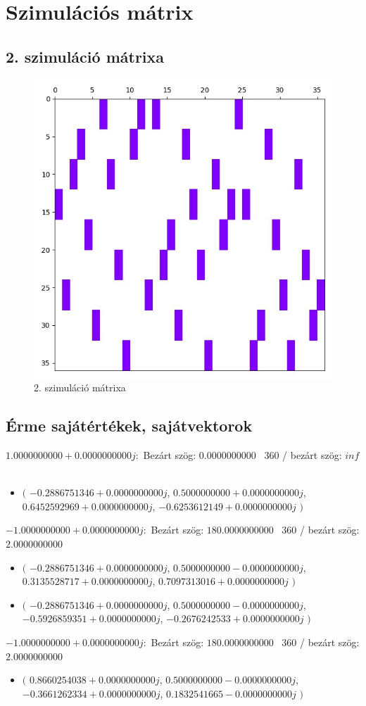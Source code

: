 \documentclass[14pt,a4paper]{article}
\begin{document}
\section{Szimulációs mátrix}
\subsection{2. szimuláció mátrixa}
\begin{figure}[H]
\centering
\includegraphics[width = 0.7\columnwidth]{sim_02/simulation_matrix.jpg}
\caption{2. szimuláció mátrixa}
\end{figure}
\subsection{Érme sajátértékek, sajátvektorok}
$1.0000000000+0.0000000000j$:\
Bezárt szög: $0.0000000000$ \
360 / bezárt szög: $inf$\
\begin{itemize}
\item
$\big($
$-0.2886751346+0.0000000000j$, $0.5000000000+0.0000000000j$, $0.6452592969+0.0000000000j$, $-0.6253612149+0.0000000000j$
$\big)$
\end{itemize}
$-1.0000000000+0.0000000000j$:\
Bezárt szög: $180.0000000000$ \
360 / bezárt szög: $2.0000000000$\
\begin{itemize}
\item
$\big($
$-0.2886751346+0.0000000000j$, $0.5000000000-0.0000000000j$, $0.3135528717+0.0000000000j$, $0.7097313016+0.0000000000j$
$\big)$
\item
$\big($
$-0.2886751346+0.0000000000j$, $0.5000000000-0.0000000000j$, $-0.5926859351+0.0000000000j$, $-0.2676242533+0.0000000000j$
$\big)$
\end{itemize}
$-1.0000000000+0.0000000000j$:\
Bezárt szög: $180.0000000000$ \
360 / bezárt szög: $2.0000000000$\
\begin{itemize}
\item
$\big($
$0.8660254038+0.0000000000j$, $0.5000000000-0.0000000000j$, $-0.3661262334+0.0000000000j$, $0.1832541665-0.0000000000j$
$\big)$
\end{itemize}
\end{document}
